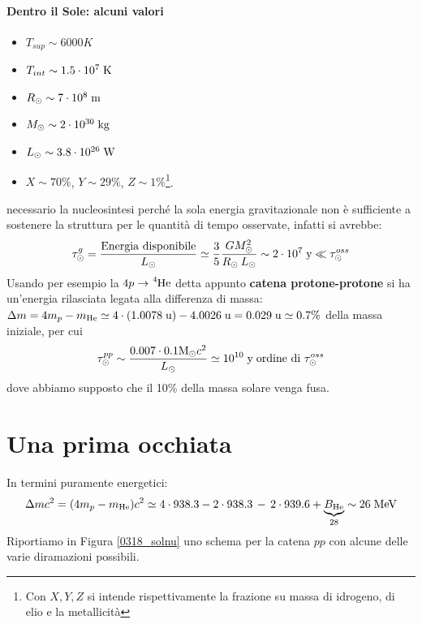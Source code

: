\paragraph{Dentro il Sole: alcuni valori}
\begin{itemize}
    \item $T_{sup}\sim 6000\unit{K}$
    \item $T_{int}\sim 1.5\cdot10^{7}\;\mbox{K}$
    \item $R_{\odot}\sim 7\cdot10^{8}\;\mbox{m}$
    \item $M_{\odot}\sim 2\cdot10^{30}\;\mbox{kg}$
    \item $L_{\odot}\sim 3.8\cdot10^{26}\;\mbox{W}$
    \item $X\sim 70\%$, $Y\sim 29\%$, $Z\sim 1\%$\footnote{Con $X,Y,Z$ si intende rispettivamente la frazione su massa di idrogeno, di elio e la metallicità}.
\end{itemize}
 necessario  la nucleosintesi perché la sola energia gravitazionale non è sufficiente a sostenere la struttura per le quantità di tempo osservate, infatti si avrebbe:
$$\tau_{\odot}^g = \frac{\text{Energia disponibile}}{L_{\odot}} \simeq \frac{3}{5}\frac{GM_{\odot}^2}{R_{\odot}\:L_{\odot} }\sim 2\cdot10^{7}\;\mbox{y}\ll\tau_{\odot}^{oss}$$
Usando per esempio la $4p\to\ce{^4He}$ detta appunto \textbf{catena protone-protone} si ha un'energia rilasciata legata alla differenza di massa: $\Delta m = 4m_p - m_{\ce{He}} \simeq 4\cdot(1.0078\unit{u})-4.0026\unit{u} = 0.029\unit{u}\simeq 0.7\%$ della massa iniziale, per cui
$$\tau_{\odot}^{pp}\sim\frac{0.007\cdot0.1\mbox{M}_{\odot} c^2}{L_{\odot}}\simeq 10^{10}\;\mbox{y} \;\text{ordine di } \tau_{\odot}^{oss}$$
dove abbiamo supposto che il 10\% della massa solare venga fusa.

\section{Una prima occhiata}
In termini puramente energetici:
$$\Delta m c^2 = (4m_p - m_{\ce{He}})c^2 \simeq 4\cdot 938.3 - 2\cdot 938.3 \,-\, 2\cdot 939.6 + \underbrace{B_{\ce{He}}}_{28} \sim 26\unit{MeV}$$
Riportiamo in Figura \ref{0318_solnu} uno schema per la catena $pp$ con alcune delle varie diramazioni possibili.

